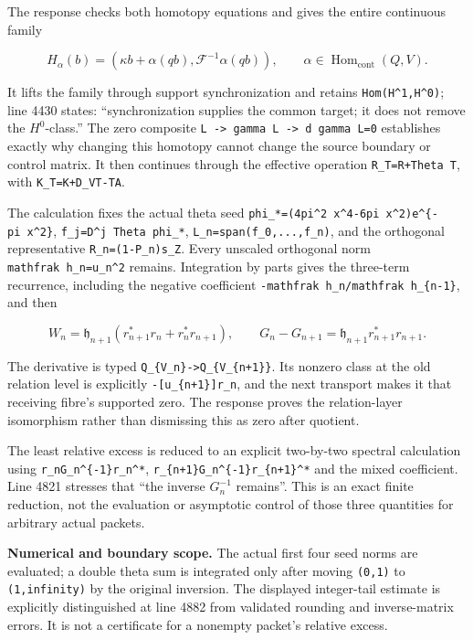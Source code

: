The response checks both homotopy equations and gives the entire
continuous family

\[
H_\alpha(b)=(\kappa b+\alpha(qb),\mathcal F^{-1}\alpha(qb)),\qquad
\alpha\in\operatorname{Hom}_{\mathrm{cont}}(Q,V).
\]

It lifts the family through support synchronization and retains
\texttt{Hom(H\^{}1,H\^{}0)}; line 4430 states: ``synchronization
supplies the common target; it does not remove the \(H^0\)-class.'' The
zero composite
\texttt{L\ -\textgreater{}\ gamma\ L\ -\textgreater{}\ d\ gamma\ L=0}
establishes exactly why changing this homotopy cannot change the source
boundary or control matrix. It then continues through the effective
operation \texttt{R\_T=R+Theta\ T}, with \texttt{K\_T=K+D\_VT-TA}.

The calculation fixes the actual theta seed
\texttt{phi\_*=(4pi\^{}2\ x\^{}4-6pi\ x\^{}2)e\^{}\{-pi\ x\^{}2\}},
\texttt{f\_j=D\^{}j\ Theta\ phi\_*}, \texttt{L\_n=span(f\_0,...,f\_n)},
and the orthogonal representative \texttt{R\_n=(1-P\_n)s\_Z}. Every
unscaled orthogonal norm
\texttt{mathfrak\ h\_n=\textbar{}\textbar{}u\_n\textbar{}\textbar{}\^{}2}
remains. Integration by parts gives the three-term recurrence, including
the negative coefficient \texttt{-mathfrak\ h\_n/mathfrak\ h\_\{n-1\}},
and then

\[
W_n=\mathfrak h_{n+1}(r_{n+1}^*r_n+r_n^*r_{n+1}),\qquad
G_n-G_{n+1}=\mathfrak h_{n+1}r_{n+1}^*r_{n+1}.
\]

The derivative is typed
\texttt{Q\_\{V\_n\}-\textgreater{}Q\_\{V\_\{n+1\}\}}. Its nonzero class
at the old relation level is explicitly \texttt{-{[}u\_\{n+1\}{]}r\_n},
and the next transport makes it that receiving fibre's supported zero.
The response proves the relation-layer isomorphism rather than
dismissing this as zero after quotient.

The least relative excess is reduced to an explicit two-by-two spectral
calculation using \texttt{r\_nG\_n\^{}\{-1\}r\_n\^{}*},
\texttt{r\_\{n+1\}G\_n\^{}\{-1\}r\_\{n+1\}\^{}*} and the mixed
coefficient. Line 4821 stresses that ``the inverse \(G_n^{-1}\)
remains''. This is an exact finite reduction, not the evaluation or
asymptotic control of those three quantities for arbitrary actual
packets.

\textbf{Numerical and boundary scope.} The actual first four seed norms
are evaluated; a double theta sum is integrated only after moving
\texttt{(0,1)} to \texttt{(1,infinity)} by the original inversion. The
displayed integer-tail estimate is explicitly distinguished at line 4882
from validated rounding and inverse-matrix errors. It is not a
certificate for a nonempty packet's relative excess.

